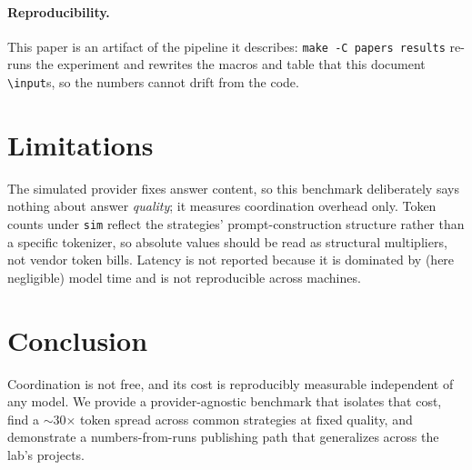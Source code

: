 \documentclass{article}
\begin{document}
\paragraph{Reproducibility.} This paper is an artifact of the pipeline it describes:
\texttt{make -C papers results} re-runs the experiment and rewrites the macros and table
that this document \texttt{\textbackslash input}s, so the numbers cannot drift from the code.

\section{Limitations}
The simulated provider fixes answer content, so this benchmark deliberately says nothing
about answer \emph{quality}; it measures coordination overhead only. Token counts under
\texttt{sim} reflect the strategies' prompt-construction structure rather than a specific
tokenizer, so absolute values should be read as structural multipliers, not vendor token
bills. Latency is not reported because it is dominated by (here negligible) model time and
is not reproducible across machines.

\section{Conclusion}
Coordination is not free, and its cost is reproducibly measurable independent of any
model. We provide a provider-agnostic benchmark that isolates that cost, find a
$\sim$30$\times$ token spread across common strategies at fixed quality, and demonstrate a
numbers-from-runs publishing path that generalizes across the lab's projects.



\end{document}
